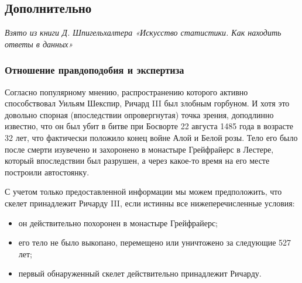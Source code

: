 \documentclass[11pt,a4paper]{article}
\providecommand{\tightlist}{%
      \setlength{\itemsep}{0pt}\setlength{\parskip}{0pt}}
\begin{document}
    \begin{center}
    \end{center}
    
    \hypertarget{ux434ux43eux43fux43eux43bux43dux438ux442ux435ux43bux44cux43dux43e}{%
\subsection{Дополнительно}\label{ux434ux43eux43fux43eux43bux43dux438ux442ux435ux43bux44cux43dux43e}}

\emph{Взято из книги Д. Шпигельхалтера «Искусство статистики. Как
находить ответы в данных»}

    \hypertarget{ux43eux442ux43dux43eux448ux435ux43dux438ux435-ux43fux440ux430ux432ux434ux43eux43fux43eux434ux43eux431ux438ux44f-ux438-ux44dux43aux441ux43fux435ux440ux442ux438ux437ux430}{%
\subsubsection{Отношение правдоподобия и
экспертиза}\label{ux43eux442ux43dux43eux448ux435ux43dux438ux435-ux43fux440ux430ux432ux434ux43eux43fux43eux434ux43eux431ux438ux44f-ux438-ux44dux43aux441ux43fux435ux440ux442ux438ux437ux430}}

    Согласно популярному мнению, распространению которого активно
способствовал Уильям Шекспир, Ричард III был злобным горбуном. И хотя
это довольно спорная (впоследствии опровергнутая) точка зрения,
доподлинно известно, что он был убит в битве при Босворте 22 августа
1485 года в возрасте 32 лет, что фактически положило конец войне Алой и
Белой розы. Тело его было после смерти изувечено и захоронено в
монастыре Грейфрайерс в Лестере, который впоследствии был разрушен, а
через какое-то время на его месте построили автостоянку.

С учетом только предоставленной информации мы можем предположить, что
скелет принадлежит Ричарду III, если истинны все нижеперечисленные
условия:

\begin{itemize}
\tightlist
\item
  он действительно похоронен в монастыре Грейфрайерс;
\item
  его тело не было выкопано, перемещено или уничтожено за следующие 527
  лет;
\item
  первый обнаруженный скелет действительно принадлежит Ричарду.
\end{itemize}
\end{document}
